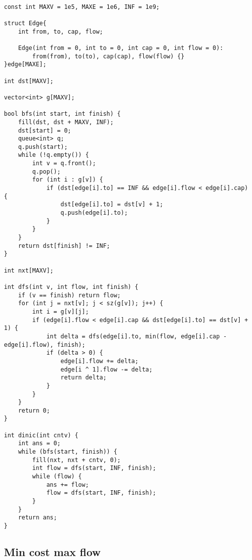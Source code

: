\documentclass{article}
\begin{document}
    \begin{verbatim}
        
const int MAXV = 1e5, MAXE = 1e6, INF = 1e9;

struct Edge{
    int from, to, cap, flow;

    Edge(int from = 0, int to = 0, int cap = 0, int flow = 0): 
        from(from), to(to), cap(cap), flow(flow) {}
}edge[MAXE];

int dst[MAXV];

vector<int> g[MAXV];

bool bfs(int start, int finish) {
    fill(dst, dst + MAXV, INF);
    dst[start] = 0;
    queue<int> q;
    q.push(start);
    while (!q.empty()) {
        int v = q.front();
        q.pop();
        for (int i : g[v]) {
            if (dst[edge[i].to] == INF && edge[i].flow < edge[i].cap) {
                dst[edge[i].to] = dst[v] + 1;
                q.push(edge[i].to);
            }
        }
    }
    return dst[finish] != INF;
}

int nxt[MAXV];

int dfs(int v, int flow, int finish) {
    if (v == finish) return flow;
    for (int j = nxt[v]; j < sz(g[v]); j++) {
        int i = g[v][j];
        if (edge[i].flow < edge[i].cap && dst[edge[i].to] == dst[v] + 1) {
            int delta = dfs(edge[i].to, min(flow, edge[i].cap - edge[i].flow), finish);
            if (delta > 0) {
                edge[i].flow += delta;
                edge[i ^ 1].flow -= delta;
                return delta;
            }
        }
    }
    return 0;
}

int dinic(int cntv) {
    int ans = 0;
    while (bfs(start, finish)) {
        fill(nxt, nxt + cntv, 0);
        int flow = dfs(start, INF, finish);
        while (flow) {
            ans += flow;
            flow = dfs(start, INF, finish);
        }
    }
    return ans;
}
    \end{verbatim}
 
    \subsection{Min cost max flow}
\end{document}
